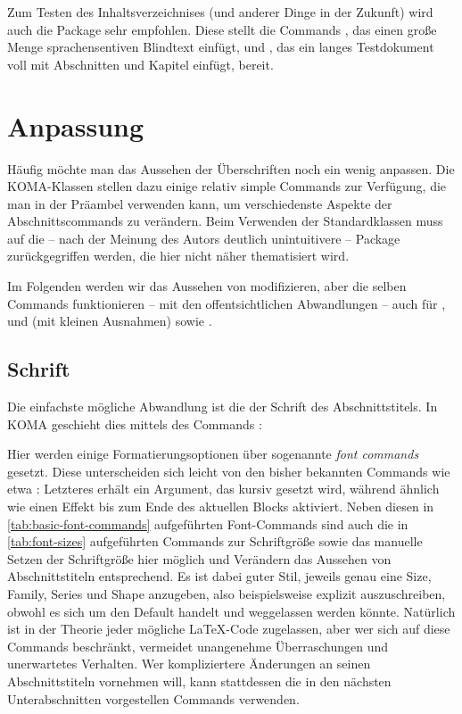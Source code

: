 Zum Testen des Inhaltsverzeichnises (und anderer Dinge in der Zukunft) wird auch die Package  sehr empfohlen.
Diese stellt die Commands , das einen große Menge sprachensentiven Blindtext einfügt, und , das ein langes Testdokument voll mit Abschnitten und Kapitel einfügt, bereit.

\section{Anpassung}
Häufig möchte man das Aussehen der Überschriften noch ein wenig anpassen.
Die KOMA-Klassen stellen dazu einige relativ simple Commands zur Verfügung, die man in der Präambel verwenden kann, um verschiedenste Aspekte der Abschnittscommands zu verändern.
Beim Verwenden der Standardklassen muss auf die -- nach der Meinung des Autors deutlich unintuitivere -- Package  zurückgegriffen werden, die hier nicht näher thematisiert wird.

Im Folgenden werden wir das Aussehen von  modifizieren, aber die selben Commands funktionieren -- mit den offentsichtlichen Abwandlungen -- auch für ,  und (mit kleinen Ausnahmen)  sowie .

\subsection{Schrift}
Die einfachste mögliche Abwandlung ist die der Schrift des Abschnittstitels.
In KOMA geschieht dies mittels des Commands :
\begin{latexlisting}
\end{latexlisting}
Hier werden einige Formatierungsoptionen über sogenannte \emph{font commands} gesetzt.
Diese unterscheiden sich leicht von den bisher bekannten Commands wie etwa : Letzteres erhält ein Argument, das kursiv gesetzt wird, während  ähnlich wie  einen Effekt bis zum Ende des aktuellen Blocks aktiviert.
Neben diesen in \autoref{tab:basic-font-commands} aufgeführten Font-Commands sind auch die in \autoref{tab:font-sizes} aufgeführten Commands zur Schriftgröße sowie das manuelle Setzen der Schriftgröße hier möglich und Verändern das Aussehen von Abschnittstiteln entsprechend.
Es ist dabei guter Stil, jeweils genau eine Size, Family, Series und Shape anzugeben, also beispielsweise  explizit auszuschreiben, obwohl es sich um den Default handelt und weggelassen werden könnte.
Natürlich ist in der Theorie jeder mögliche \LaTeX -Code zugelassen, aber wer sich auf diese Commands beschränkt, vermeidet unangenehme Überraschungen und unerwartetes Verhalten.
Wer kompliziertere Änderungen an seinen Abschnittstiteln vornehmen will, kann stattdessen die in den nächsten Unterabschnitten vorgestellen Commands verwenden.

